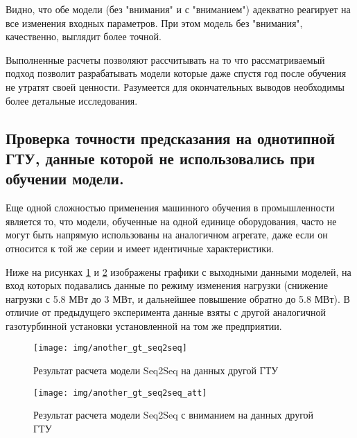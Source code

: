 \documentclass[12pt,a4paper]{article}
\begin{document}
Видно, что обе модели (без "внимания" и с "вниманием") адекватно реагирует на все изменения входных параметров. При этом модель без "внимания", качественно, выглядит более точной. 

Выполненные расчеты позволяют рассчитывать на то что рассматриваемый подход позволит разрабатывать модели которые даже спустя год после обучения не утратят своей ценности. Разумеется для окончательных выводов необходимы более детальные исследования.


\subsection{Проверка точности предсказания на однотипной ГТУ, данные которой не использовались при обучении модели.}


Еще одной сложностью применения машинного обучения в промышленности является то, что модели, обученные на одной единице оборудования, часто не могут быть напрямую использованы на аналогичном агрегате, даже если он относится к той же серии и имеет идентичные характеристики.

Ниже на рисунках \ref{fig:another_gt_seq2seq} и \ref{fig:another_gt_seq2seq_att} изображены графики с выходными данными моделей, на вход которых подавались данные по режиму изменения нагрузки (снижение нагрузки с 5.8 МВт до 3 МВт, и дальнейшее повышение обратно до 5.8 МВт). В отличие от предыдущего эксперимента данные взяты с другой аналогичной газотурбинной установки установленной на том же предприятии.

\begin{figure}[htbp]
	\centering\texttt{[image: img/another\_gt\_seq2seq]}
	\caption{Результат расчета модели Seq2Seq на данных другой ГТУ}
	\label{fig:another_gt_seq2seq}
\end{figure}

\begin{figure}[htbp]
	\centering\texttt{[image: img/another\_gt\_seq2seq\_att]}
	\caption{Результат расчета модели Seq2Seq с вниманием на данных другой ГТУ}
	\label{fig:another_gt_seq2seq_att}
\end{figure}

\end{document}
